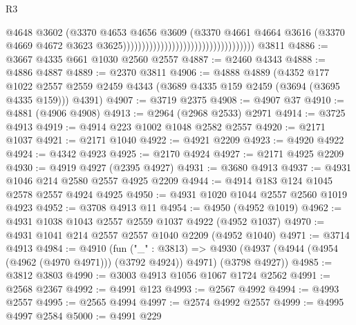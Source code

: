 \begin{lexlean}{R3}
\begin{coremodule}
                                                                    @4648
                                                                    @3602
                                                                    (@3370
                                                                      @4653
                                                                      @4656
                                                                      @3609
                                                                      (@3370
                                                                        @4661
                                                                        @4664
                                                                        @3616
                                                                        (@3370
                                                                          @4669
                                                                          @4672
                                                                          @3623
                                                                          @3625)))))))))))))))))))))))))))))))))))
    @3811
@4886 := @3667 @4335 @661 @1030 @2560 @2557
@4887 := @2460 @4343
@4888 := @4886 @4887
@4889 := @2370 @3811
@4906 := @4888
    @4889
    (@4352
      @177
      @1022
      @2557
      @2559
      @2459
      @4343
      (@3689 @4335 @159 @2459 (@3694 (@3695 @4335 @159)))
      @4391)
@4907 := @3719 @2375
@4908 := @4907 @37
@4910 := @4881 (@4906 @4908)
@4913 := @2964 (@2968 @2533) @2971
@4914 := @3725 @4913
@4919 := @4914 @223 @1002 @1048 @2582 @2557
@4920 := @2171 @1037
@4921 := @2171 @1040
@4922 := @4921 @2209
@4923 := @4920 @4922
@4924 := @4342 @4923
@4925 := @2170 @4924
@4927 := @2171 @4925 @2209
@4930 := @4919 @4927 (@2395 @4927)
@4931 := @3680 @4913
@4937 := @4931 @1046 @214 @2580 @2557 @4925 @2209
@4944 := @4914 @183 @124 @1045 @2578 @2557 @4924 @4925
@4950 := @4931 @1020 @1044 @2557 @2560 @1019 @4923
@4952 := @3708 @4913 @11
@4954 := @4950 (@4952 @1019)
@4962 := @4931 @1038 @1043 @2557 @2559 @1037 @4922 (@4952 @1037)
@4970 := @4931 @1041 @214 @2557 @2557 @1040 @2209 (@4952 @1040)
@4971 := @3714 @4913
@4984 := @4910
    (fun ("_" : @3813) =>
    @4930 (@4937 (@4944 (@4954 (@4962 (@4970 @4971))) (@3792 @4924)) @4971) (@3798 @4927))
@4985 := @3812 @3803
@4990 := @3003 @4913 @1056 @1067 @1724 @2562
@4991 := @2568 @2367
@4992 := @4991 @123
@4993 := @2567 @4992
@4994 := @4993 @2557
@4995 := @2565 @4994
@4997 := @2574 @4992 @2557
@4999 := @4995 @4997 @2584
@5000 := @4991 @229

\end{coremodule}
\end{lexlean}
